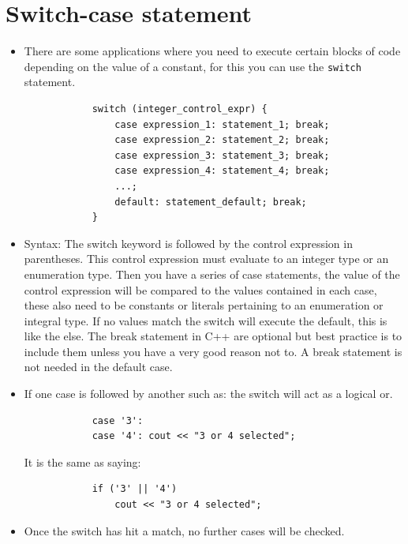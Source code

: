 \section{Switch-case statement}
\begin{itemize}
    \item There are some applications where you need to execute certain blocks of code depending on the value of a constant, for this you can use the \texttt{switch} statement.
        \begin{verbatim}
            switch (integer_control_expr) {
                case expression_1: statement_1; break;
                case expression_2: statement_2; break;
                case expression_3: statement_3; break;
                case expression_4: statement_4; break;
                ...;
                default: statement_default; break;
            }
        \end{verbatim}
    \item Syntax: The switch keyword is followed by the control expression in parentheses. This control expression must evaluate to an integer type or an enumeration type. Then you have a series of case statements, the value of the control expression will be compared to the values contained in each case, these also need to be constants or literals pertaining to an enumeration or integral type. If no values match the switch will execute the default, this is like the else. The break statement in C++ are optional but best practice is to include them unless you have a very good reason not to. A break statement is not needed in the default case.
    \item If one case is followed by another such as: the switch will act as a logical or.
        \begin{verbatim}
            case '3':
            case '4': cout << "3 or 4 selected";
        \end{verbatim}
        It is the same as saying:
        \begin{verbatim}
            if ('3' || '4') 
                cout << "3 or 4 selected";
        \end{verbatim}
    
    \item Once the switch has hit a match, no further cases will be checked.
\end{itemize}


